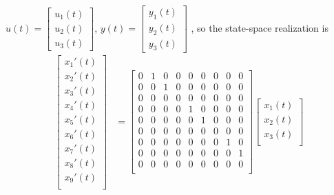 \documentclass[12pt,a4paper]{article}
\begin{document}
$u(t) = \begin{bmatrix}
    u_1(t)\\
    u_2(t) \\
    u_3(t)
\end{bmatrix}
$, $y(t) = \begin{bmatrix}
    y_1(t)\\
    y_2(t)\\
    y_3(t)
\end{bmatrix}
$
, so the state-space realization is
\[
    \begin{aligned}
        \begin{bmatrix}
            x_1'(t) \\
            x_2'(t) \\
            x_3'(t) \\
            x_4'(t) \\
            x_5'(t) \\
            x_6'(t) \\
            x_7'(t) \\
            x_8'(t) \\
            x_9'(t) \\
        \end{bmatrix} & = \begin{bmatrix}
                            0 & 1 & 0 & 0 & 0 & 0 & 0 & 0 & 0 \\
                            0 & 0 & 1 & 0 & 0 & 0 & 0 & 0 & 0 \\
                            0 & 0 & 0 & 0 & 0 & 0 & 0 & 0 & 0 \\
                            0 & 0 & 0 & 0 & 1 & 0 & 0 & 0 & 0 \\
                            0 & 0 & 0 & 0 & 0 & 1 & 0 & 0 & 0 \\
                            0 & 0 & 0 & 0 & 0 & 0 & 0 & 0 & 0 \\
                            0 & 0 & 0 & 0 & 0 & 0 & 0 & 1 & 0 \\
                            0 & 0 & 0 & 0 & 0 & 0 & 0 & 0 & 1 \\
                            0 & 0 & 0 & 0 & 0 & 0 & 0 & 0 & 0 \\
                        \end{bmatrix} \begin{bmatrix}
                                        x_1(t) \\
                                        x_2(t) \\
                                        x_3(t) \\

\end{bmatrix}
\end{aligned}\]
\end{document}
